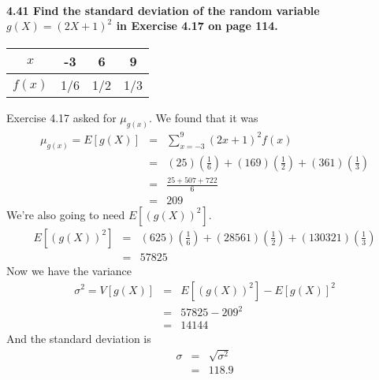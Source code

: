 \documentclass{article}
\begin{document}
\paragraph{4.41 Find the standard deviation of the random variable 
$g(X)=(2X+1)^2$ in Exercise 4.17 on page 114.}
\begin{center}\begin{tabular}{c | c c c}
$x$    & -3  & 6   & 9\\
\hline
$f(x)$ & 1/6 & 1/2 & 1/3
\end{tabular}\end{center}
Exercise 4.17 asked for $\mu_{g(x)}$. We found that it was
\begin{eqnarray*}
\mu_{g(x)} = E[g(X)] & = & \sum_{x=-3}^9 (2x+1)^2f(x)\\
	& = & (25)\left(\frac{1}{6}\right)+(169)\left(\frac{1}{2}\right)+
			(361)\left(\frac{1}{3}\right)\\
	& = & \frac{25+507+722}{6}\\
	& = & 209
\end{eqnarray*}
We're also going to need $E[(g(X))^2]$.
\begin{eqnarray*}
E[(g(X))^2] & = & (625)\left(\frac{1}{6}\right)+
			(28561)\left(\frac{1}{2}\right)+
			(130321)\left(\frac{1}{3}\right)\\
	& = & 57825
\end{eqnarray*}
Now we have the variance
\begin{eqnarray*}
\sigma^2=V[g(X)] & = & E[(g(X))^2]-E[g(X)]^2\\
	& = & 57825 - 209^2\\
	& = & 14144
\end{eqnarray*}
And the standard deviation is
\begin{eqnarray*}
\sigma & = & \sqrt{\sigma^2}\\
	& = & \boxed{118.9}
\end{eqnarray*}
\end{document}

